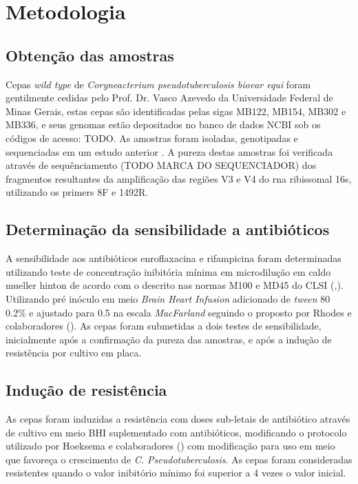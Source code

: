 \section{Metodologia}

\subsection{Obtenção das amostras}

Cepas \textit{wild type} de \textit{Coryneacterium pseudotuberculosis biovar equi} foram gentilmente cedidas pelo Prof. Dr. Vasco Azevedo 
da Universidade Federal de Minas Gerais, estas cepas são identificadas pelas sigas MB122, MB154, MB302 e MB336, e seus genomas estão
depositados no banco de dados NCBI sob os códigos de acesso: TODO. As amostras foram isoladas, genotipadas e sequenciadas em um estudo anterior \cite{barauna2017}.
A pureza destas amostras foi verificada através de sequênciamento (TODO MARCA DO SEQUENCIADOR) dos fragmentos resultantes da 
amplificação das regiões V3 e V4 do rna ribissomal 16s, utilizando os primers 8F e 1492R.



\subsection{Determinação da sensibilidade a antibióticos}

A sensibilidade aos antibióticos enroflaxacina e rifampicina foram determinadas utilizando teste de concentração inibitória mínima em microdilução em 
caldo mueller hinton de acordo com o descrito nas
normas M100 e MD45 do CLSI (\citeyear{clsi2015},\citeyear{clsi2020}). Utilizando pré inóculo em meio \textit{Brain Heart Infusion} adicionado de \textit{tween} 80 0.2\%
e ajustado para 0.5 na escala \textit{MacFarland} seguindo o proposto por Rhodes e colaboradores (\citeyear{rhodes2015}).
As cepas foram submetidas a dois testes de sensibilidade, inicialmente após a confirmação da pureza das amostras, e após a indução de resistência por cultivo em placa.


\subsection{Indução de resistência}

As cepas foram induzidas a resistência com doses sub-letais de antibiótico através de cultivo em meio BHI suplementado com antibióticos,
modificando o protocolo utilizado por Hoeksema e colaboradores (\citeyear{hoeksema2019}) com modificação para uso em meio que favoreça o crescimento de \textit{C. Pseudotuberculosis}. 
As cepas foram consideradas resistentes quando o valor inibitório mínimo foi superior a 4 vezes o valor inicial.


